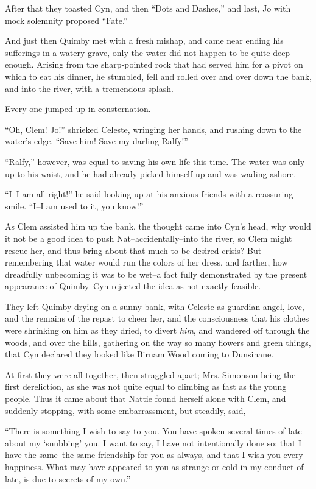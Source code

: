 After that they toasted Cyn, and then ``Dots and Dashes,'' and last, Jo
with mock solemnity proposed ``Fate.''

And just then Quimby met with a fresh mishap, and came near ending his
sufferings in a watery grave, only the water did not happen to be quite
deep enough. Arising from the sharp-pointed rock that had served him for
a pivot on which to eat his dinner, he stumbled, fell and rolled over
and over down the bank, and into the river, with a tremendous splash.

Every one jumped up in consternation.

``Oh, Clem! Jo!'' shrieked Celeste, wringing her hands, and rushing down
to the water's edge. ``Save him! Save my darling Ralfy!''

``Ralfy,'' however, was equal to saving his own life this time. The water
was only up to his waist, and he had already picked himself up and was
wading ashore.

``I--I am all right!'' he said looking up at his anxious friends with a
reassuring smile. ``I--I am used to it, you know!''

As Clem assisted him up the bank, the thought came into Cyn's head, why
would it not be a good idea to push Nat--accidentally--into the river,
so Clem might rescue her, and thus bring about that much to be desired
crisis? But remembering that water would run the colors of her dress,
and farther, how dreadfully unbecoming it was to be wet--a fact fully
demonstrated by the present appearance of Quimby--Cyn rejected the idea
as not exactly feasible.

They left Quimby drying on a sunny bank, with Celeste as guardian angel,
love, and the remains of the repast to cheer her, and the consciousness
that his clothes were shrinking on him as they dried, to divert \emph{him}, and
wandered off through the woods, and over the hills, gathering on the way
so many flowers and green things, that Cyn declared they looked like
Birnam Wood coming to Dunsinane.

At first they were all together, then straggled apart; Mrs. Simonson
being the first dereliction, as she was not quite equal to climbing as
fast as the young people. Thus it came about that Nattie found herself
alone with Clem, and suddenly stopping, with some embarrassment, but
steadily, said,

``There is something I wish to say to you. You have spoken several times
of late about my `snubbing' you. I want to say, I have not intentionally
done so; that I have the same--the same friendship for you as always,
and that I wish you every happiness. What may have appeared to you as
strange or cold in my conduct of late, is due to secrets of my own.''

